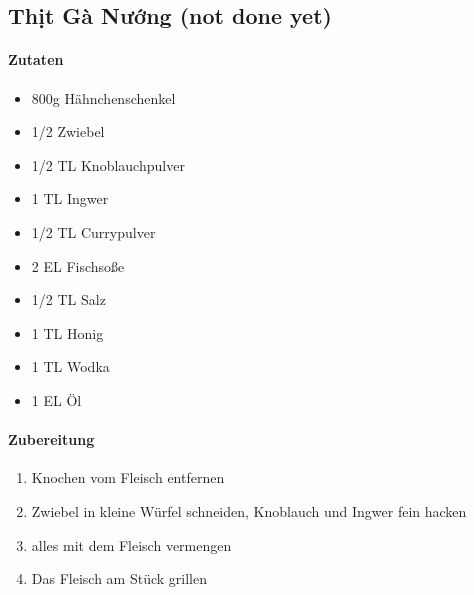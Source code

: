 \newpage
{}
\subsection{Thịt Gà Nướng (not done yet)}
\paragraph{Zutaten}
\begin{itemize}[noitemsep]
	\item 800g Hähnchenschenkel
	\item 1/2 Zwiebel
	\item 1/2 TL Knoblauchpulver
	\item 1 TL Ingwer 
	\item 1/2 TL Currypulver
	\item 2 EL Fischsoße
	\item 1/2 TL Salz
	\item 1 TL Honig
	\item 1 TL Wodka
	\item 1 EL Öl
\end{itemize}

\paragraph{Zubereitung}
\begin{enumerate}[noitemsep]
	\item Knochen vom Fleisch entfernen
	\item Zwiebel in kleine Würfel schneiden, Knoblauch und Ingwer fein hacken
	\item alles mit dem Fleisch vermengen
	\item Das Fleisch am Stück grillen
\end{enumerate}